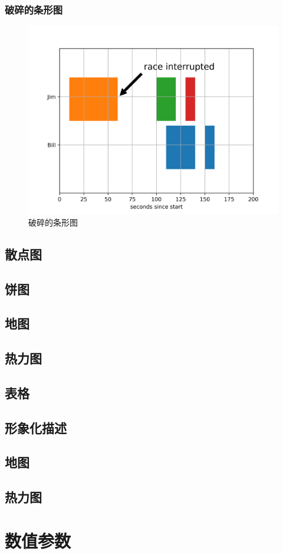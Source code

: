\documentclass[openany]{progbookcn}
\begin{document}
\subsection{破碎的条形图}

\begin{figure}[H]
\centering
\includegraphics[width=0.6 \textwidth]{figs/chapter24/bars/BrokenBar}
\caption{破碎的条形图}
\end{figure}

\section{散点图}
\section{饼图}
\section{地图}
\section{热力图}
\section{表格}
\section{形象化描述}
\section{地图}
\section{热力图}
\chapter{数值参数}
\end{document}
